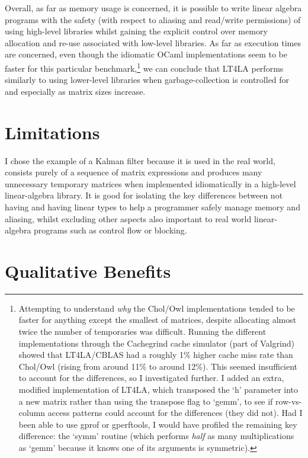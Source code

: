 Overall, as far as memory usage is concerned, it is possible to write linear
algebra programs with the safety (with respect to aliasing and read/write
permissions) of using high-level libraries whilst gaining the explicit control
over memory allocation and re-use associated with low-level libraries.
As far as execution times are concerned, even though the idiomatic OCaml
implementations seem to be faster for this particular
benchmark,\footnote{Attempting to understand \emph{why} the
    Chol/Owl implementations tended to be faster for anything except the
    smallest of matrices, despite allocating almost twice the number of
    temporaries was difficult. Running the different implementations through
    the Cachegrind cache simulator (part of Valgrind) showed that LT4LA/CBLAS
    had a roughly 1\% higher cache miss rate than Chol/Owl (rising from around
    11\% to around 12\%). This seemed insufficient to account for the
    differences, so I investigated further. I added an extra, modified
    implementation of LT4LA, which transposed the `h' parameter into a new
    matrix rather than using the transpose flag to `gemm', to see if
    row-vs-column access patterns could account for the differences (they did
    not). Had I been able to use gprof or gperftools, I would have profiled the
    remaining key difference: the `symm' routine (which performs \emph{half} as
    many multiplications as `gemm' because it knows one of its
    arguments is symmetric).}
we can conclude that LT4LA performs similarly to using lower-level libraries
when garbage-collection is controlled for and especially as matrix sizes increase.

\section{Limitations}

I chose the example of a Kalman filter because it is used in the real world,
consists purely of a sequence of matrix expressions and produces many
unnecessary temporary matrices when implemented idiomatically in a high-level
linear-algebra library. It is good for isolating the key differences between
not having and having linear types to help a programmer safely manage memory
and aliasing, whilst excluding other aspects also important to real world
linear-algebra programs such as control flow or blocking.

\section{Qualitative Benefits}

